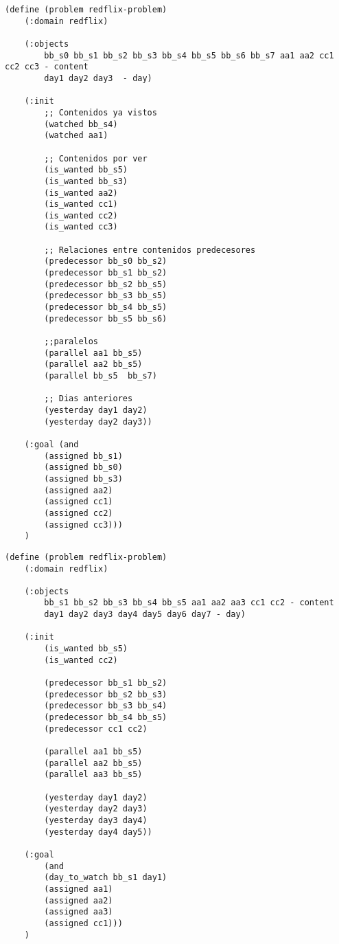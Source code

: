 \documentclass[a4paper]{article}
\begin{document}
	
	\noindent
	\begin{minipage}[t]{0.45\textwidth}
	\begin{lstlisting}[language=PDDL, caption={Joc de Prova 1 - Extensió 3}, label={lst:JP13}]                     
	(define (problem redflix-problem)
	(:domain redflix)
	
	(:objects
		bb_s0 bb_s1 bb_s2 bb_s3 bb_s4 bb_s5 bb_s6 bb_s7 aa1 aa2 cc1 cc2 cc3 - content
		day1 day2 day3  - day)
	
	(:init
		;; Contenidos ya vistos
		(watched bb_s4)
		(watched aa1)
		
		;; Contenidos por ver
		(is_wanted bb_s5)
		(is_wanted bb_s3)
		(is_wanted aa2)
		(is_wanted cc1)
		(is_wanted cc2)
		(is_wanted cc3)
		
		;; Relaciones entre contenidos predecesores
		(predecessor bb_s0 bb_s2)
		(predecessor bb_s1 bb_s2)
		(predecessor bb_s2 bb_s5)
		(predecessor bb_s3 bb_s5)
		(predecessor bb_s4 bb_s5)
		(predecessor bb_s5 bb_s6)
		
		;;paralelos
		(parallel aa1 bb_s5)
		(parallel aa2 bb_s5)
		(parallel bb_s5  bb_s7)
		
		;; Dias anteriores
		(yesterday day1 day2)
		(yesterday day2 day3))
	
	(:goal (and
		(assigned bb_s1)
		(assigned bb_s0)
		(assigned bb_s3)
		(assigned aa2)
		(assigned cc1)
		(assigned cc2)
		(assigned cc3)))
	)	
	\end{lstlisting}
	\end{minipage}
	\hfill
	\begin{minipage}[t]{0.45\textwidth}
	\begin{lstlisting}[language=PDDL, caption={Joc de Prova 2 - Extensió 3}, label={lst:JP23}]                    (define (problem redflix-problem)
	(:domain redflix)
	
	(:objects
		bb_s1 bb_s2 bb_s3 bb_s4 bb_s5 aa1 aa2 aa3 cc1 cc2 - content
		day1 day2 day3 day4 day5 day6 day7 - day)
	
	(:init
		(is_wanted bb_s5)
		(is_wanted cc2)
		
		(predecessor bb_s1 bb_s2)
		(predecessor bb_s2 bb_s3)
		(predecessor bb_s3 bb_s4)
		(predecessor bb_s4 bb_s5)
		(predecessor cc1 cc2)
		
		(parallel aa1 bb_s5)
		(parallel aa2 bb_s5)
		(parallel aa3 bb_s5)
		
		(yesterday day1 day2)
		(yesterday day2 day3)
		(yesterday day3 day4)
		(yesterday day4 day5))
	
	(:goal
		(and
		(day_to_watch bb_s1 day1)
		(assigned aa1)
		(assigned aa2)
		(assigned aa3)
		(assigned cc1)))
	)	
	\end{lstlisting}
	\end{minipage}
	
\end{document}
